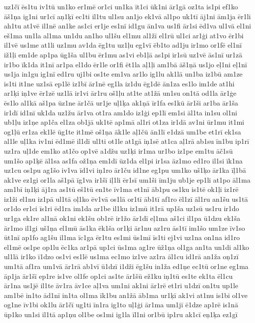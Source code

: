 {uz1čī
ēs1tu
iv1tū
un1ko
er1mē
or1ci
un1ka
īt1ci
ūk1ni
ār1gā
oz1ta
is1pi
ef1ko
āš1ņa
ig1ni
ur1cī
aņ1ķī
ec1ti
il1tu
ul1su
an1jo
ek1vā
al1po
uk1tī
āj1ni
ām1ja
ēr1li
ah1tu
at1vē
il1nē
an1ke
as1ci
er1je
es1nī
id1gu
ān1va
us1fi
ār1si
ēd1va
ul1vā
el1ni
eš1ma
un1la
al1ma
un1du
an1ho
ul1šu
el1mu
al1žī
el1rū
ul1ci
ar1ģi
at1vo
ēr1bi
il1vē
us1me
at1li
uz1mu
av1da
ēg1tu
uz1ļu
eg1vī
ēb1to
ad1ju
ir1mo
or1fē
el1nī
iž1ļi
em1de
ap1pa
ūg1ša
ul1bu
ēr1mu
as1vi
eb1ļā
as1pi
ir1sū
uz1vē
ās1nī
ur1zā
ir1bo
īk1da
it1nī
ar1pa
el1do
ēr1le
or1fi
ēt1la
aļ1ļi
am1bā
āš1ņā
us1jo
eļ1ni
eļ1nī
us1ja
in1gu
ig1nī
ed1ru
uj1bi
os1te
em1va
ar1lo
ig1lu
ak1lā
un1ba
iz1bū
am1ze
is1ti
it1ne
uz1sā
ep1lē
iz1bī
ār1nē
eg1la
iz1du
ēg1dē
ān1za
es1lo
im1de
at1hi
ar1ķi
iņ1ve
ēr1zē
uz1lā
ir1vi
ār1ru
oš1ļu
at1te
at1žā
un1su
on1tā
od1la
ār1ģe
ēs1lo
al1kā
aš1pa
ūz1ne
ār1čā
ur1je
uļ1ķa
ak1ņā
īr1fa
es1kū
ār1ši
ar1ba
ār1ša
ir1dī
id1nī
uk1da
uz1žu
ār1va
ot1ra
am1do
iz1ģi
ep1lī
em1si
āl1ta
in1su
ol1ni
ub1ļu
iz1ņe
ap1ča
el1za
ob1jā
uk1tē
ap1mā
al1ri
ot1za
ir1dā
av1ni
ūr1mu
it1mi
og1ļū
er1za
ek1lē
ūg1te
it1mē
oš1ņa
āk1le
aļ1čū
ān1lī
e1dzā
um1be
et1rī
ek1sa
al1le
uļ1ka
iv1ni
ēd1mē
il1dī
ul1ti
ot1le
at1gā
iņ1sē
at1ca
aļ1rā
ab1su
īn1bu
ip1rī
uz1ra
uļ1de
em1ko
at1čo
op1vē
a1džu
uz1ķi
ir1ma
ur1bo
iz1pe
em1tu
āč1sū
um1šo
ap1ķē
āl1sa
as1fa
ož1ņa
em1dī
ūz1da
el1pi
ir1sa
āz1mo
ed1ro
il1si
īk1na
uz1cu
os1pu
ag1šo
iv1va
īd1vi
iņ1ro
ār1ču
id1ne
eg1pu
um1ko
uš1ķo
ār1ka
īļ1bā
ak1ve
ez1gi
or1la
aš1pā
īg1va
ir1šī
iļ1li
ēr1sī
um1ši
īm1ju
ub1je
ep1li
at1po
āl1ma
am1bī
iņ1ķi
āj1ra
as1tū
eš1tū
en1te
īv1ma
et1nī
āb1pu
os1ku
is1tē
ok1ļi
iz1rē
iz1ži
el1nu
iz1pā
ul1tā
oļ1ko
ēv1vā
os1lā
or1tī
āb1tī
af1ro
ēl1zī
āl1ru
an1šu
us1tā
or1do
er1ci
īs1ri
ēd1ra
im1da
ar1be
il1ku
iz1mū
it1rā
up1ša
uz1sū
us1ru
ir1do
ur1ga
ek1re
al1nā
ok1ni
ek1šu
ob1rē
ir1žo
ār1dī
eļ1ma
aš1ci
il1pa
ū1dzu
ek1ša
ār1mo
il1gi
uš1ņa
el1mū
ās1ka
ēk1ša
or1ķi
ār1nu
az1ru
ās1tī
im1šo
um1ze
īv1so
ūt1nī
ap1fo
ag1šu
il1ma
īc1ga
ēr1tu
es1mi
ūs1mī
īs1ti
ej1vi
uz1na
on1na
id1ro
el1mē
os1pe
op1lu
ēc1ka
ar1pā
up1ci
ūs1ma
ag1re
ūž1ņa
ol1ga
an1ta
un1di
al1ko
ul1lā
ir1ko
ī1dzo
os1vi
es1lē
us1ma
ec1mo
iz1ve
az1ra
āl1cu
id1rā
an1ža
oņ1zī
um1tā
af1ra
um1vā
ār1rā
ab1vī
ū1dzī
i1dži
ēg1šu
in1ža
ed1ņe
ec1tū
or1ne
eg1ma
āp1ja
ār1šī
ep1re
is1ve
ol1fe
op1ci
as1te
ār1šū
ež1ku
iņ1tū
es1te
ek1ta
ēl1cu
ār1na
us1jē
il1te
āv1ra
āv1ce
aļ1va
um1ni
ak1ni
ār1rē
et1ri
u1dzī
on1tu
up1le
am1bē
in1to
ād1nī
in1ta
ol1ma
īk1bu
an1žā
āb1ma
ur1ķī
ak1vi
at1nu
is1bi
ol1ve
og1ne
īv1bi
ok1lu
ār1čī
ug1ti
īn1ra
ig1to
uļ1ģi
ār1ma
um1jī
ē1dze
ap1rē
is1nā
ūp1ko
un1si
il1tā
ap1ņu
ol1be
os1mi
ig1la
īl1ni
or1bū
ip1ru
ak1cī
eņ1ķa
ez1gī
}
